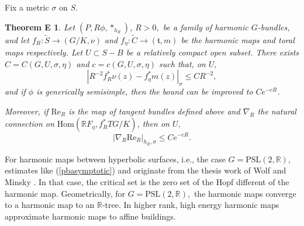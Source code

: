 \documentclass[10pt]{amsart}
\newcommand{\R}{\mathbb R}
\newcommand{\ft}{\mathfrak{t}}
\newtheorem*{thme}{Theorem E}
\theoremstyle{definition}
\begin{document}

Fix a metric $\sigma$ on $S$. 
\begin{thme} Let $(P,R\phi,*_{h_R})$, $R>0,$ be a family of harmonic $G$-bundles, and let $f_R: \tilde{S} \to (G/K, \nu)$ and $f_\eta: \tilde{C} \to (\ft, m)$ be the harmonic maps and toral maps respectively. Let $U\subset S-B$ be a relatively compact open subset. There exists $C=C(G,U,\sigma, \eta)$ and $c=c(G,U,\sigma, \eta)$ such that, on $U,$
\begin{equation}\label{pbasymptotic}
        |R^{-2}f_R^*\nu(z) - f_\eta^*m(z)|_\sigma \leq CR^{-2},
    \end{equation}
and if $\phi$ is generically semisimple, then the bound can be improved to $Ce^{-cR}$.

Moreover, if $\mathrm{Re}_R$ is the map of tangent bundles defined above and $\nabla_R$ the natural connection on $\mathrm{Hom}(\R F_\eta, f_R^*TG/K)$, then on $U,$ 
\begin{equation}\label{iotanearlyparallel}
    |\nabla_R \mathrm{Re}_R|_{h_R,\sigma} \leq Ce^{-cR}.
\end{equation}
\end{thme}
For harmonic maps between hyperbolic surfaces, i.e., the case $G=\textrm{PSL}(2,\R)$, estimates like (\ref{pbasymptotic}) and originate from the thesis work of Wolf \cite{Wo} and Minsky \cite{Mi}. In that case, the critical set is the zero set of the Hopf different of the harmonic map. Geometrically, for $G=\textrm{PSL}(2,\R),$ the harmonic maps converge to a harmonic map to an $\R$-tree. In higher rank, high energy harmonic maps approximate harmonic maps to affine buildings.
\end{document}
